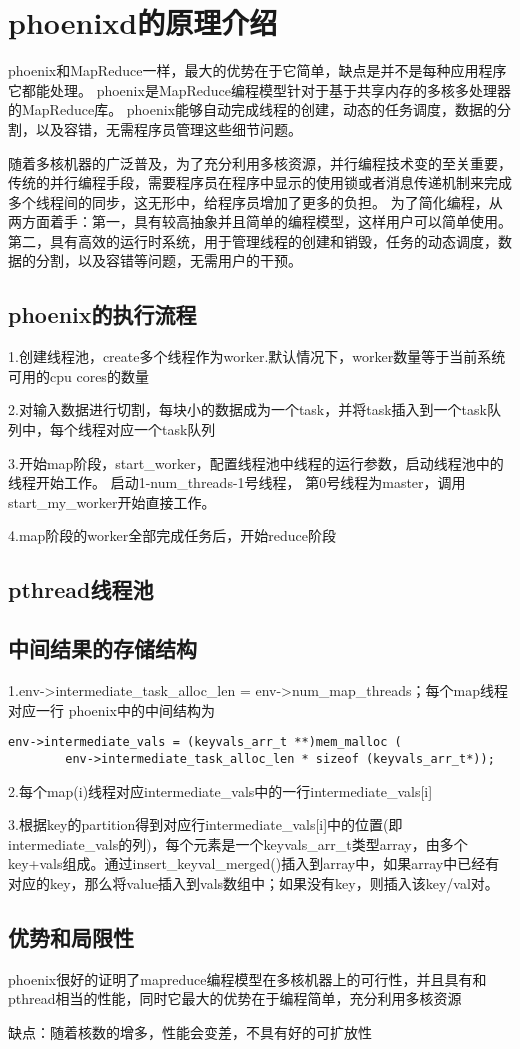 \section{phoenixd的原理介绍}
phoenix和MapReduce一样，最大的优势在于它简单，缺点是并不是每种应用程序它都能处理。
phoenix是MapReduce编程模型针对于基于共享内存的多核多处理器的MapReduce库。
phoenix能够自动完成线程的创建，动态的任务调度，数据的分割，以及容错，无需程序员管理这些细节问题。

随着多核机器的广泛普及，为了充分利用多核资源，并行编程技术变的至关重要，传统的并行编程手段，需要程序员在程序中显示的使用锁或者消息传递机制来完成多个线程间的同步，这无形中，给程序员增加了更多的负担。
为了简化编程，从两方面着手：第一，具有较高抽象并且简单的编程模型，这样用户可以简单使用。第二，具有高效的运行时系统，用于管理线程的创建和销毁，任务的动态调度，数据的分割，以及容错等问题，无需用户的干预。
\subsection{phoenix的执行流程}
1.创建线程池，create多个线程作为worker.默认情况下，worker数量等于当前系统可用的cpu cores的数量

2.对输入数据进行切割，每块小的数据成为一个task，并将task插入到一个task队列中，每个线程对应一个task队列

3.开始map阶段，start\_worker，配置线程池中线程的运行参数，启动线程池中的线程开始工作。
启动1-num\_threads-1号线程， 第0号线程为master，调用start\_my\_worker开始直接工作。

4.map阶段的worker全部完成任务后，开始reduce阶段

\subsection{pthread线程池}

\subsection{中间结果的存储结构}
1.env->intermediate\_task\_alloc\_len = env->num\_map\_threads；每个map线程对应一行
phoenix中的中间结构为
\begin{lstlisting}
env->intermediate_vals = (keyvals_arr_t **)mem_malloc (
        env->intermediate_task_alloc_len * sizeof (keyvals_arr_t*));
\end{lstlisting}

2.每个map(i)线程对应intermediate\_vals中的一行intermediate\_vals[i]

3.根据key的partition得到对应行intermediate\_vals[i]中的位置(即intermediate\_vals的列)，每个元素是一个keyvals\_arr\_t类型array，由多个key+vals组成。通过insert\_keyval\_merged()插入到array中，如果array中已经有对应的key，那么将value插入到vals数组中；如果没有key，则插入该key/val对。

\subsection{优势和局限性}
phoenix很好的证明了mapreduce编程模型在多核机器上的可行性，并且具有和pthread相当的性能，同时它最大的优势在于编程简单，充分利用多核资源

缺点：随着核数的增多，性能会变差，不具有好的可扩放性
